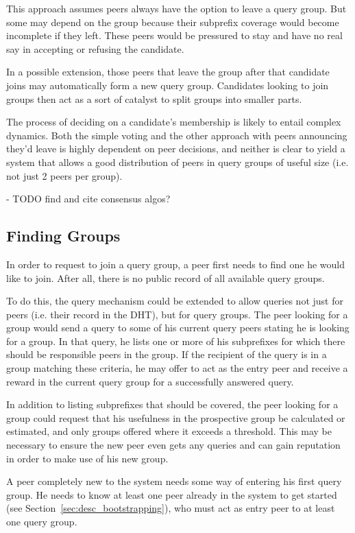 This approach assumes peers always have the option to leave a query group. But
some may depend on the group because their subprefix coverage would become
incomplete if they left. These peers would be pressured to stay and have no real
say in accepting or refusing the candidate.

In a possible extension, those peers that leave the group after that candidate
joins may automatically form a new query group. Candidates looking to join
groups then act as a sort of catalyst to split groups into smaller parts.

The process of deciding on a candidate's membership is likely to entail complex
dynamics. Both the simple voting and the other approach with peers announcing
they'd leave is highly dependent on peer decisions, and neither is clear to
yield a system that allows a good distribution of peers in query groups of
useful size (i.e. not just 2 peers per group).

- TODO find and cite consensus algos?

\subsection{Finding Groups}
In order to request to join a query group, a peer first needs to find one he
would like to join. After all, there is no public record of all available query
groups.

To do this, the query mechanism could be extended to allow queries not just for
peers (i.e. their record in the \ac{DHT}), but for query groups. The peer
looking for a group would send a query to some of his current query peers
stating he is looking for a group. In that query, he lists one or more of his
subprefixes for which there should be responsible peers in the group. If the
recipient of the query is in a group matching these criteria, he may offer to
act as the entry peer and receive a reward in the current query group for a
successfully answered query.

In addition to listing subprefixes that should be covered, the peer looking for
a group could request that his usefulness in the prospective group be calculated
or estimated, and only groups offered where it exceeds a threshold. This may be
necessary to ensure the new peer even gets any queries and can gain reputation
in order to make use of his new group.

A peer completely new to the system needs some way of entering his first query
group. He needs to know at least one peer already in the system to get started
(see Section~\ref{sec:desc_bootstrapping}), who must act as entry peer to at
least one query group.

